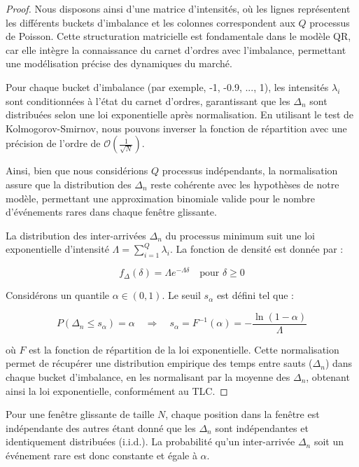 \documentclass[12pt,a4paper]{article}
\theoremstyle{definition}
\theoremstyle{remark}
\begin{document}
    \begin{proof}
    Nous disposons ainsi d'une matrice d'intensités, où les lignes représentent les différents buckets d'imbalance et les colonnes correspondent aux $Q$ processus de Poisson. Cette structuration matricielle est fondamentale dans le modèle QR, car elle intègre la connaissance du carnet d'ordres avec l'imbalance, permettant une modélisation précise des dynamiques du marché.

    Pour chaque bucket d'imbalance (par exemple, -1, -0.9, ..., 1), les intensités $\lambda_i$ sont conditionnées à l'état du carnet d'ordres, garantissant que les $\Delta_n$ sont distribuées selon une loi exponentielle après normalisation. En utilisant le test de Kolmogorov-Smirnov, nous pouvons inverser la fonction de répartition avec une précision de l'ordre de $\mathcal{O}\left(\frac{1}{\sqrt{N}}\right)$.

    Ainsi, bien que nous considérions $Q$ processus indépendants, la normalisation assure que la distribution des $\Delta_n$ reste cohérente avec les hypothèses de notre modèle, permettant une approximation binomiale valide pour le nombre d'événements rares dans chaque fenêtre glissante.

    La distribution des inter-arrivées $\Delta_n$ du processus minimum suit une loi exponentielle d'intensité $\Lambda = \sum_{i=1}^Q \lambda_i$. La fonction de densité est donnée par :

    \[
    f_{\Delta}(\delta) = \Lambda e^{-\Lambda \delta} \quad \text{pour } \delta \geq 0
    \]

    Considérons un quantile $\alpha \in (0,1)$. Le seuil $s_\alpha$ est défini tel que :

    \[
    P(\Delta_n \leq s_\alpha) = \alpha \quad \Rightarrow \quad s_\alpha = F^{-1}(\alpha) = -\frac{\ln(1 - \alpha)}{\Lambda}
    \]

    où $F$ est la fonction de répartition de la loi exponentielle. Cette normalisation permet de récupérer une distribution empirique des temps entre sauts ($\Delta_n$) dans chaque bucket d'imbalance, en les normalisant par la moyenne des $\Delta_n$, obtenant ainsi la loi exponentielle, conformément au TLC.

    \end{proof}


    Pour une fenêtre glissante de taille $N$, chaque position dans la fenêtre est indépendante des autres étant donné que les $\Delta_n$ sont indépendantes et identiquement distribuées (i.i.d.). La probabilité qu'un inter-arrivée $\Delta_n$ soit un événement rare est donc constante et égale à $\alpha$.
\end{document}
